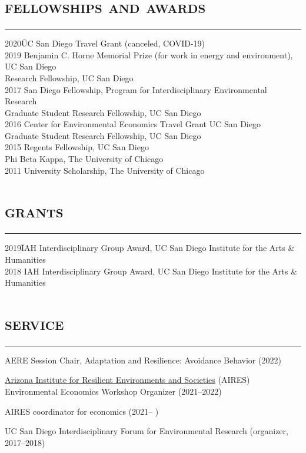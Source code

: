 \documentclass[letterpaper]{article}
\renewenvironment{itemize}{
  \begin{list}{}{
    \setlength{\leftmargin}{1em}
      \setlength{\itemsep}{0.25em}
    \setlength{\parskip}{0pt}
    \setlength{\parsep}{0pt} 
  }
}{
  \end{list}
}
\begin{document}
\section*{\textsc{\textbf{fellowships and awards}}}
\hrule
\vspace{.2cm}
\begin{tabbing}
2020\quad \= UC San Diego Travel Grant (canceled, COVID-19) \\
2019\quad \> Benjamin C. Horne Memorial Prize (for work in energy and environment), UC San Diego\\
  \> Research Fellowship, UC San Diego \\
2017  \> San Diego Fellowship, Program for Interdisciplinary Environmental Research \\
 \> Graduate Student Research Fellowship, UC San Diego\\
2016 \> Center for Environmental Economics Travel Grant UC San Diego \\ 
\> Graduate Student Research Fellowship, UC San Diego\\
2015 \> Regents Fellowship, UC San Diego \\
\> Phi Beta Kappa, The University of Chicago\\
2011 \> University Scholarship, The University of Chicago
\end{tabbing}


\section*{\textsc{\textbf{grants}}}
\hrule
\vspace{.2cm}
\begin{tabbing}
2019\quad \= IAH Interdisciplinary Group Award, UC San Diego Institute for the Arts \& Humanities \\ %
2018  \> IAH Interdisciplinary Group Award, UC San Diego Institute for the Arts \& Humanities %
\end{tabbing}


\section*{\textsc{\textbf{service}}}
\hrule
\vspace{.2cm}

\begin{itemize}
\item AERE Session Chair, Adaptation and Resilience: Avoidance Behavior (2022)
\item  \href{https://environment.arizona.edu/air}{Arizona Institute for Resilient Environments and Societies} (AIRES) Environmental Economics Workshop Organizer (2021--2022)
\item AIRES coordinator for economics (2021-- )
\item UC San Diego Interdisciplinary Forum for Environmental Research (organizer, 2017--2018)
\end{itemize}
\end{document}
